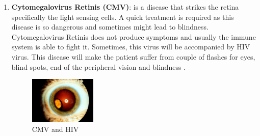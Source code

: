 \begin{enumerate}
\item \textbf{Cytomegalovirus Retinis (CMV)}: is a disease that strikes the retina specifically the light sensing cells.
A quick treatment is required as this disease is so dangerous and sometimes might lead to blindness.
Cytomegalovirus Retinis does not produce symptoms and usually the immune system is able to fight it.
Sometimes, this virus will be accompanied by HIV virus.
This disease will make the patient suffer from couple of flashes for eyes, blind spots, end of the peripheral vision and blindness \cite{yeager1981prevention}.
\begin{figure}[htb]
        \centering
        \includegraphics[width=0.3\textwidth]{figures/CMV.jpg} %
  \caption{CMV and HIV \cite{CMV}}
  \label{fig:Central Loss}
\end{figure} 


\end{enumerate}
